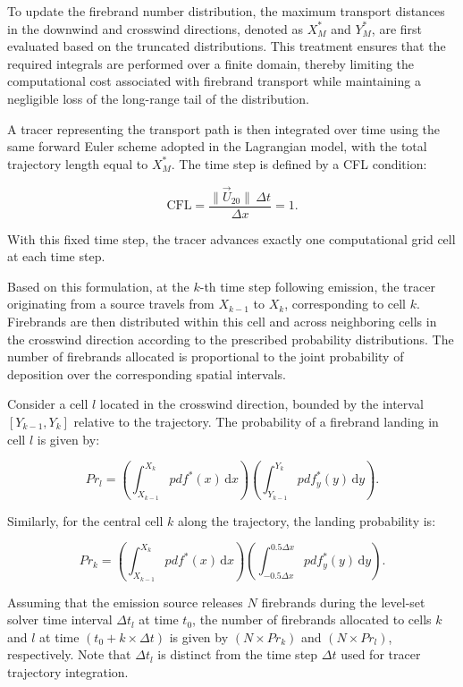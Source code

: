 To update the firebrand number distribution, the maximum transport distances in the downwind and crosswind directions, denoted as $X_M^*$ and $Y_M^*$, are first evaluated based on the truncated distributions. This treatment ensures that the required integrals are performed over a finite domain, thereby limiting the computational cost associated with firebrand transport while maintaining a negligible loss of the long-range tail of the distribution.

A tracer representing the transport path is then integrated over time using the same forward Euler scheme adopted in the Lagrangian model, with the total trajectory length equal to $X_M^*$. The time step is defined by a CFL condition:

\[
\mathrm{CFL} = \frac{\|\vec{U}_{20}\| \, \Delta t}{\Delta x} = 1.
\]

With this fixed time step, the tracer advances exactly one computational grid cell at each time step.

Based on this formulation, at the $k$-th time step following emission, the tracer originating from a source travels from $X_{k-1}$ to $X_k$, corresponding to cell $k$. Firebrands are then distributed within this cell and across neighboring cells in the crosswind direction according to the prescribed probability distributions. The number of firebrands allocated is proportional to the joint probability of deposition over the corresponding spatial intervals.

Consider a cell $l$ located in the crosswind direction, bounded by the interval $[Y_{k-1}, Y_k]$ relative to the trajectory. The probability of a firebrand landing in cell $l$ is given by:

\[
Pr_l = \left( \int_{X_{k-1}}^{X_k} pdf^*(x)\, \mathrm{d}x \right)
       \left( \int_{Y_{k-1}}^{Y_k} pdf_y^*(y)\, \mathrm{d}y \right).
\]

Similarly, for the central cell $k$ along the trajectory, the landing probability is:

\[
Pr_k = \left( \int_{X_{k-1}}^{X_k} pdf^*(x)\, \mathrm{d}x \right)
       \left( \int_{-0.5\Delta x}^{0.5\Delta x} pdf_y^*(y)\, \mathrm{d}y \right).
\]

Assuming that the emission source releases $N$ firebrands during the level-set solver time interval $\Delta t_l$ at time $t_0$, the number of firebrands allocated to cells $k$ and $l$ at time $(t_0 + k\times \Delta t)$ is given by $(N \times Pr_k)$ and $(N \times Pr_l)$, respectively. Note that $\Delta t_l$ is distinct from the time step $\Delta t$ used for tracer trajectory integration.

